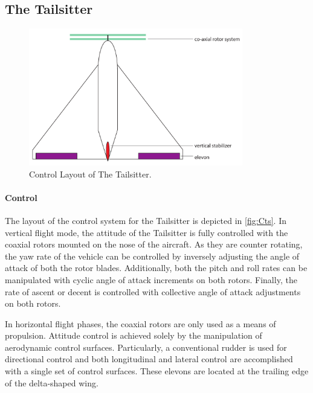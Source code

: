 \subsection{The Tailsitter}
\begin{figure}[htb]
    \centering
    \includegraphics[height=6cm]{Stability/Figures/concept_1.pdf}
    \caption{Control Layout of The Tailsitter.}
    \label{fig:Cts}
\end{figure}
\paragraph{Control}

The layout of the control system for the Tailsitter is depicted in \autoref{fig:Cts}. In vertical flight mode, the attitude of the Tailsitter is fully controlled with the coaxial rotors mounted on the nose of the aircraft. As they are counter rotating, the yaw rate of the vehicle can be controlled by inversely adjusting the angle of attack of both the rotor blades. Additionally, both the pitch and roll rates can be manipulated with cyclic angle of attack increments on both rotors. Finally, the rate of ascent or decent is controlled with collective angle of attack adjustments on both rotors. 

In horizontal flight phases, the coaxial rotors are only used as a means of propulsion. Attitude control is achieved solely by the manipulation of aerodynamic control surfaces. Particularly, a conventional rudder is used for directional control and both longitudinal and lateral control are accomplished with a single set of control surfaces. These elevons are located at the trailing edge of the delta-shaped wing.

